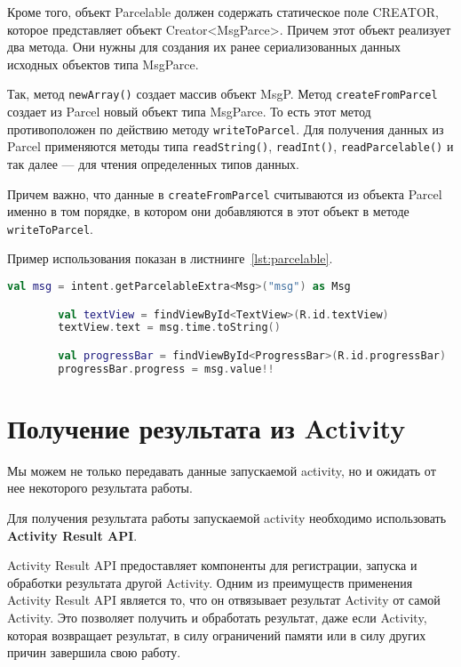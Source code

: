 Кроме того, объект Parcelable должен содержать статическое поле
CREATOR, которое представляет объект Creator<MsgParce>. Причем этот объект
реализует два метода. Они нужны для создания их ранее сериализованных
данных исходных объектов типа MsgParce.\par
Так, метод \texttt{newArray()} создает массив объект MsgP.
Метод \texttt{createFromParcel} создает из Parcel новый объект типа MsgParce.
То есть этот метод противоположен по действию методу \texttt{writeToParcel}.
Для получения данных из Parcel применяются методы типа \texttt{readString()},
\texttt{readInt()}, \texttt{readParcelable()} и так далее --- для чтения
определенных типов данных.\par
Причем важно, что данные в \texttt{createFromParcel} считываются из объекта
Parcel именно в том порядке, в котором они добавляются в этот объект в методе
\texttt{writeToParcel}.\par
Пример использования показан в листнинге~\ref{lst:parcelable}.

\begin{lstlisting}[language=Kotlin, caption=\leftline{}, label=lst:parcelable]
val msg = intent.getParcelableExtra<Msg>("msg") as Msg

        val textView = findViewById<TextView>(R.id.textView)
        textView.text = msg.time.toString()

        val progressBar = findViewById<ProgressBar>(R.id.progressBar)
        progressBar.progress = msg.value!!
\end{lstlisting}

\section{Получение результата из Activity}
Мы можем не только передавать данные запускаемой activity, но и ожидать
от нее некоторого результата работы.\par
Для получения результата работы запускаемой activity
необходимо использовать \textbf{Activity Result API}.\par
Activity Result API предоставляет компоненты для регистрации, запуска и
обработки результата другой Activity. Одним из преимуществ применения
Activity Result API является то, что он отвязывает результат Activity от самой
Activity. Это позволяет получить и обработать результат, даже если Activity,
которая возвращает результат, в силу ограничений памяти или в силу других
причин завершила свою работу.\par

